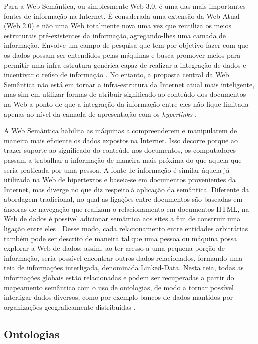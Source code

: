 Para \cite{Berners-lee2001} a Web Semântica, ou simplesmente Web 3.0, é uma das mais importantes fontes de informação na Internet. É considerada uma extensão da Web Atual (Web 2.0) e não uma Web totalmente nova \citep{Yong-gui2010} uma vez que reutiliza os meios estruturais pré-existentes da informação, agregando-lhes uma camada de informação. Envolve um campo de pesquisa que tem por objetivo fazer com que os dados possam ser entendidos pelas máquinas \citep{Stumme2006} e busca promover meios para permitir uma infra-estrutura genérica capaz de realizar a integração de dados e incentivar o reúso de informação \citep{Bojars2008}. No entanto, a proposta central da Web Semântica não está em tornar a infra-estrutura da Internet atual mais inteligente, mas sim em utilizar formas de atribuir significado ao conteúdo dos documentos na Web a ponto de que a integração da informação entre eles não fique limitada apenas ao nível da camada de apresentação com os \emph{hyperlinks} \citep{Allemang2011}. 

A Web Semântica habilita as máquinas a compreenderem e manipularem de maneira mais eficiente os dados expostos na Internet. Isso decorre porque ao trazer suporte ao significado do conteúdo nos documentos, os computadores passam a trabalhar a informação de maneira mais próxima do que aquela que seria praticada por uma pessoa. A fonte de informação é similar àquela já utilizada na Web de hipertextos e baseia-se em documentos provenientes da Internet, mas diverge no que diz respeito à aplicação da semântica. Diferente da abordagem tradicional, no qual as ligações entre documentos são baseadas em âncoras de navegação que realizam o relacionamento em documentos HTML, na Web de dados é possível adicionar semântica aos sites a fim de construir uma ligação entre eles \citep{Bojars2008}. Desse modo, cada relacionamento entre entidades arbitrárias também pode ser descrito de maneira tal que uma pessoa ou máquina possa explorar a Web de dados; assim, ao ter acesso a uma pequena porção de informação, seria possível encontrar outros dados relacionados, formando uma teia de informações interligada, denominada Linked-Data. Nesta teia, todas as informações globais estão relacionadas e podem ser recuperadas a partir do mapeamento semântico com o uso de ontologias, de modo a tornar possível interligar dados diversos, como por exemplo bancos de dados mantidos por organizações geograficamente distribuídas \citep{Bizer2009}.

\subsection{Ontologias}
\label{sec:ontologias}


